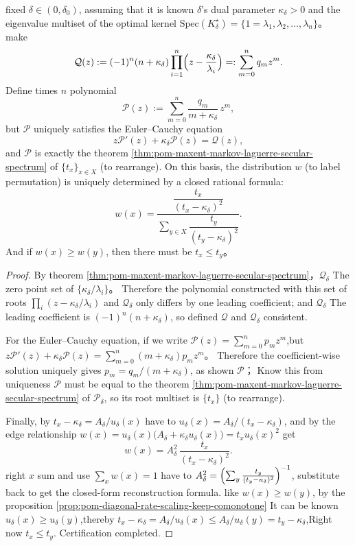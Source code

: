 \begin{theorem}\label{thm:pom-maxent-markov-spectrum-single-shot-inversion}
fixed \(\delta\in(0,\delta_0)\), assuming that it is known \(\delta\)'s dual parameter \(\kappa_\delta>0\) and the eigenvalue multiset of the optimal kernel
\(
\mathrm{Spec}(K^\star_\delta)=\{1=\lambda_1,\lambda_2,\dots,\lambda_n\}
\)。
make
\[
\mathcal Q(z):=(-1)^n(n+\kappa_\delta)\prod_{i=1}^{n}\Bigl(z-\frac{\kappa_\delta}{\lambda_i}\Bigr)
=:\sum_{m=0}^{n}q_m z^m.
\]
Define times \(n\) polynomial
\[
\mathcal P(z):=\sum_{m=0}^{n}\frac{q_m}{m+\kappa_\delta}\,z^m,
\]
but \(\mathcal P\) uniquely satisfies the Euler--Cauchy equation
\[
z\mathcal P'(z)+\kappa_\delta \mathcal P(z)=\mathcal Q(z),
\]
and \(\mathcal P\) is exactly the theorem \ref{thm:pom-maxent-markov-laguerre-secular-spectrum} of \(\{t_x\}_{x\in X}\) (to rearrange).
On this basis, the distribution \(w\) (to label permutation) is uniquely determined by a closed rational formula:
\[
w(x)=\frac{\dfrac{t_x}{(t_x-\kappa_\delta)^2}}{\sum_{y\in X}\dfrac{t_y}{(t_y-\kappa_\delta)^2}}.
\]
And if \(w(x)\ge w(y)\), then there must be \(t_x\le t_y\)。
\end{theorem}
\begin{proof}
By theorem \ref{thm:pom-maxent-markov-laguerre-secular-spectrum}，\(\mathcal Q_\delta\) The zero point set of \(\{\kappa_\delta/\lambda_i\}\)。
Therefore the polynomial constructed with this set of roots \(\prod_i(z-\kappa_\delta/\lambda_i)\) and \(\mathcal Q_\delta\) only differs by one leading coefficient;
and \(\mathcal Q_\delta\) The leading coefficient is \((-1)^n(n+\kappa_\delta)\), so defined \(\mathcal Q\) and \(\mathcal Q_\delta\) consistent.
\par
For the Euler--Cauchy equation, if we write \(\mathcal P(z)=\sum_{m=0}^{n}p_m z^m\),but
\(
z\mathcal P'(z)+\kappa_\delta\mathcal P(z)=\sum_{m=0}^{n}(m+\kappa_\delta)p_m z^m
\)。
Therefore the coefficient-wise solution uniquely gives \(p_m=q_m/(m+\kappa_\delta)\), as shown \(\mathcal P\)；
Know this from uniqueness \(\mathcal P\) must be equal to the theorem \ref{thm:pom-maxent-markov-laguerre-secular-spectrum} of \(\mathcal P_\delta\), so its root multiset is \(\{t_x\}\) (to rearrange).
\par
Finally, by \(t_x-\kappa_\delta=A_\delta/u_\delta(x)\) have to \(u_\delta(x)=A_\delta/(t_x-\kappa_\delta)\), and by the edge relationship
\(
w(x)=u_\delta(x)\bigl(A_\delta+\kappa_\delta u_\delta(x)\bigr)
=t_xu_\delta(x)^2
\)
get
\[
w(x)=A_\delta^2\,\frac{t_x}{(t_x-\kappa_\delta)^2}.
\]
right \(x\) sum and use \(\sum_x w(x)=1\) have to \(A_\delta^2=\Bigl(\sum_y \frac{t_y}{(t_y-\kappa_\delta)^2}\Bigr)^{-1}\), substitute back to get the closed-form reconstruction formula.
like \(w(x)\ge w(y)\), by the proposition \ref{prop:pom-diagonal-rate-scaling-keep-comonotone} It can be known \(u_\delta(x)\ge u_\delta(y)\),thereby \(t_x-\kappa_\delta=A_\delta/u_\delta(x)\le A_\delta/u_\delta(y)=t_y-\kappa_\delta\),Right now \(t_x\le t_y\). Certification completed.
\end{proof}

